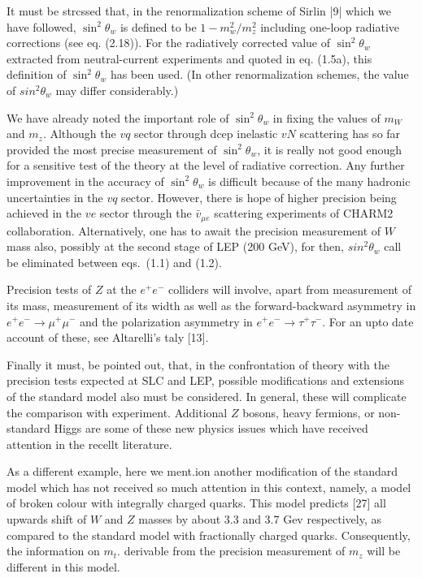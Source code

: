 {It must be strcssed that, in the renormalization scheme of Sirlin |9| which
we have followed, $\sin^{2} \theta_{w}$ is defined to be $1-m^{2}_{w}/m^{2}_{z}$ including one-loop radiative corrections (see eq. (2.18)). For the radiatively corrected value of $\sin^{2} \theta_{w}$ extracted from neutral-current experiments and quoted in eq. (1.5a), this definition of $\sin^{2} \theta_{w}$ has been used. (In other renormalization schemes, the value of $sin^{2} \theta_{w}$ may differ considerably.)


We have already noted the important role of $\sin^{2} \theta_{w}$ in fixing the values of
$m_{W}$ and $m_{z}$. Although the $vq$ sector through dcep inelastic $vN$ scattering has
so far provided the most precise measurement of $\sin^{2} \theta_{w}$, it is really not good
enough for a sensitive test of the theory at the level of radiative correction.
Any further improvement in the accuracy of $\sin^{2} \theta_{w}$ is difficult because of the
many hadronic uncertainties in the $vq$ sector. However, there is hope of higher
precision being achieved in the $ve$ sector through the $\bar{v}_{\mu e}$ scattering experiments of CHARM2  collaboration. Alternatively, one has to await the precision
measurement of $W$ mass also, possibly at the second stage of LEP (200 GeV),
for then, $sin^{2} \theta_{w}$ call be eliminated between eqs.~(1.1) and (1.2).

Precision tests of $Z$ at the $e^{+} e^{-}$ colliders will involve, apart from measurement of its mass, measurement of its width as well as the forward-backward asymmetry in $e^{+} e^{-} \rightarrow \mu^{+} \mu^{-}$ and the polarization asymmetry in $e^{+} e^{-} \rightarrow \tau^{+} \tau^{-}$. For an upto date account of these, see Altarelli's taly [13].

Finally it must, be pointed out, that, in the confrontation of theory with the
precision tests expected at SLC and LEP, possible modifications and extensions
of the standard model also must be considered. In general, these will complicate
the comparison with experiment. Additional $Z$ bosons, heavy fermions, or
non-standard Higgs are some of these new physics issues which have received
attention in the recellt literature.

As a different example, here we ment.ion another modification of the standard model which has not received so much attention in this context, namely,
a model of broken colour with integrally charged quarks. This model predicts
[27] all upwards shift of  $W$ and $Z$ masses by about 3.3 and 3.7 Gev respectively,
as compared to the standard model with fractionally charged quarks. Consequently, the information on $m_{t}$. derivable from the precision measurement of $m_{z}$ will  be different in this model.

}
